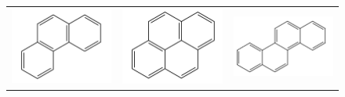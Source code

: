 \begin{figure}[p]
\begin{center}
{\begin{tabular}{c c c}
 			\includegraphics[scale=0.28]{image/phenanthrene} & \includegraphics[scale=0.28]{image/pyrene} & \includegraphics[scale=0.28]{image/chrysene} \\

\end{tabular}}
\end{center}
\end{figure}
